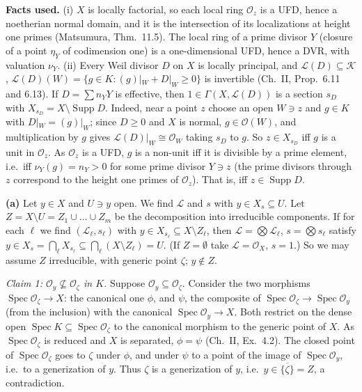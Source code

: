 \documentclass[11pt]{article}
\begin{document}
\textbf{Facts used.} (i) $X$ is locally factorial, so each local ring $\mathcal O_z$ is a UFD, hence a noetherian normal domain, and it is the intersection of its localizations at height one primes (Matsumura, Thm.~11.5). The local ring of a prime divisor $Y$ (closure of a point $\eta_Y$ of codimension one) is a one-dimensional UFD, hence a DVR, with valuation $\nu_Y$. (ii) Every Weil divisor $D$ on $X$ is locally principal, and $\mathcal L(D)\subseteq\mathcal K$, $\mathcal L(D)(W)=\{g\in K:(g)|_W+D|_W\ge0\}$ is invertible (Ch.~II, Prop.~6.11 and 6.13). If $D=\sum n_YY$ is effective, then $1\in\Gamma(X,\mathcal L(D))$ is a section $s_D$ with $X_{s_D}=X\setminus\operatorname{Supp}D$. Indeed, near a point $z$ choose an open $W\ni z$ and $g\in K$ with $D|_W=(g)|_W$; since $D\ge0$ and $X$ is normal, $g\in\mathcal O(W)$, and multiplication by $g$ gives $\mathcal L(D)|_W\cong\mathcal O_W$ taking $s_D$ to $g$. So $z\in X_{s_D}$ iff $g$ is a unit in $\mathcal O_z$. As $\mathcal O_z$ is a UFD, $g$ is a non-unit iff it is divisible by a prime element, i.e.\ iff $\nu_Y(g)=n_Y>0$ for some prime divisor $Y\ni z$ (the prime divisors through $z$ correspond to the height one primes of $\mathcal O_z$). That is, iff $z\in\operatorname{Supp}D$.

\textbf{(a)} Let $y\in X$ and $U\ni y$ open. We find $\mathcal L$ and $s$ with $y\in X_s\subseteq U$. Let $Z=X\setminus U=Z_1\cup\dots\cup Z_m$ be the decomposition into irreducible components. If for each $\ell$ we find $(\mathcal L_\ell,s_\ell)$ with $y\in X_{s_\ell}\subseteq X\setminus Z_\ell$, then $\mathcal L=\bigotimes\mathcal L_\ell$, $s=\bigotimes s_\ell$ satisfy $y\in X_s=\bigcap_\ell X_{s_\ell}\subseteq\bigcap_\ell(X\setminus Z_\ell)=U$. (If $Z=\emptyset$ take $\mathcal L=\mathcal O_X$, $s=1$.) So we may assume $Z$ irreducible, with generic point $\zeta$; $y\notin Z$.

\emph{Claim 1: $\mathcal O_y\not\subseteq\mathcal O_\zeta$ in $K$.} Suppose $\mathcal O_y\subseteq\mathcal O_\zeta$. Consider the two morphisms $\operatorname{Spec}\mathcal O_\zeta\to X$: the canonical one $\phi$, and $\psi$, the composite of $\operatorname{Spec}\mathcal O_\zeta\to\operatorname{Spec}\mathcal O_y$ (from the inclusion) with the canonical $\operatorname{Spec}\mathcal O_y\to X$. Both restrict on the dense open $\operatorname{Spec}K\subseteq\operatorname{Spec}\mathcal O_\zeta$ to the canonical morphism to the generic point of $X$. As $\operatorname{Spec}\mathcal O_\zeta$ is reduced and $X$ is separated, $\phi=\psi$ (Ch.~II, Ex.~4.2). The closed point of $\operatorname{Spec}\mathcal O_\zeta$ goes to $\zeta$ under $\phi$, and under $\psi$ to a point of the image of $\operatorname{Spec}\mathcal O_y$, i.e.\ to a generization of $y$. Thus $\zeta$ is a generization of $y$, i.e.\ $y\in\overline{\{\zeta\}}=Z$, a contradiction.
\end{document}
